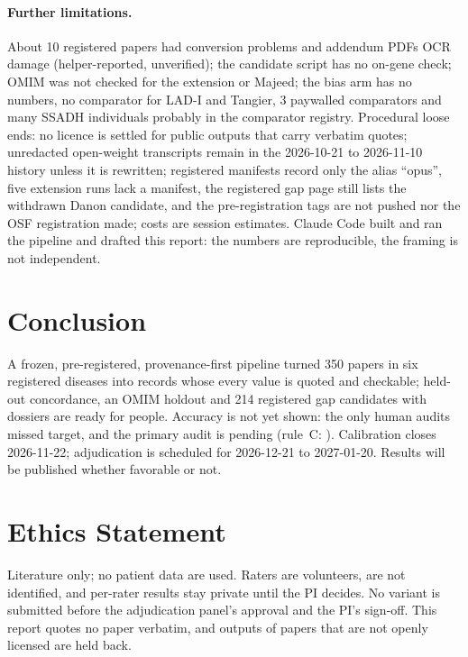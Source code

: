 \documentclass{article} %
\begin{document}
\paragraph{Further limitations.} About 10 registered papers had conversion problems and addendum PDFs OCR damage (helper-reported, unverified); the candidate script has no on-gene check; OMIM was not checked for the extension or Majeed; the bias arm has no numbers, no comparator for LAD-I and Tangier, 3 paywalled comparators and many SSADH individuals probably in the comparator registry. Procedural loose ends: no licence is settled for public outputs that carry verbatim quotes; unredacted open-weight transcripts remain in the 2026-10-21 to 2026-11-10 history unless it is rewritten; registered manifests record only the alias ``opus'', five extension runs lack a manifest, the registered gap page still lists the withdrawn Danon candidate, and the pre-registration tags are not pushed nor the OSF registration made; costs are session estimates. Claude Code built and ran the pipeline and drafted this report: the numbers are reproducible, the framing is not independent.

\section{Conclusion}
\label{sec:conclusion}
A frozen, pre-registered, provenance-first pipeline turned 350 papers in six registered diseases into records whose every value is quoted and checkable; held-out concordance, an OMIM holdout and 214 registered gap candidates with dossiers are ready for people. Accuracy is not yet shown: the only human audits missed target, and the primary audit is pending (rule~C: ). Calibration closes 2026-11-22; adjudication is scheduled for 2026-12-21 to 2027-01-20. Results will be published whether favorable or not.

\section*{Ethics Statement}
Literature only; no patient data are used. Raters are volunteers, are not identified, and per-rater results stay private until the PI decides. No variant is submitted before the adjudication panel's approval and the PI's sign-off. This report quotes no paper verbatim, and outputs of papers that are not openly licensed are held back.
\end{document}
